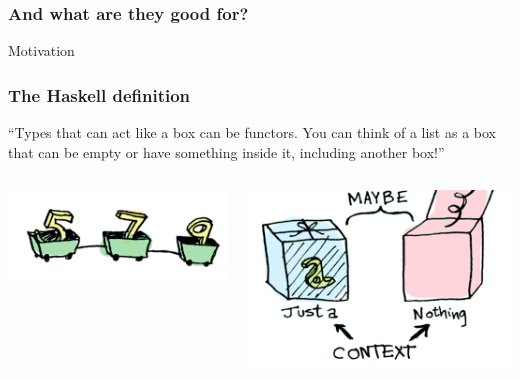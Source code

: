 \documentclass[12pt, xcolor=table]{beamer}
\begin{document}
\begin{frame}
    \frametitle{And what are they good for?}
    Motivation
\end{frame}

\begin{frame}
    \frametitle{The Haskell definition}
    ``Types that can act like a box can be functors. You can think of a list as a box that can be empty or have something inside it, including another box!''
    \vspace{30px}
    \begin{columns}
            \begin{center}
            \includegraphics[scale=0.4]{figures/list.png}
            \end{center}
            \begin{center}
            \includegraphics[scale=0.4]{figures/maybe.png}
            \end{center}
    \end{columns}
\end{frame}
\end{document}
